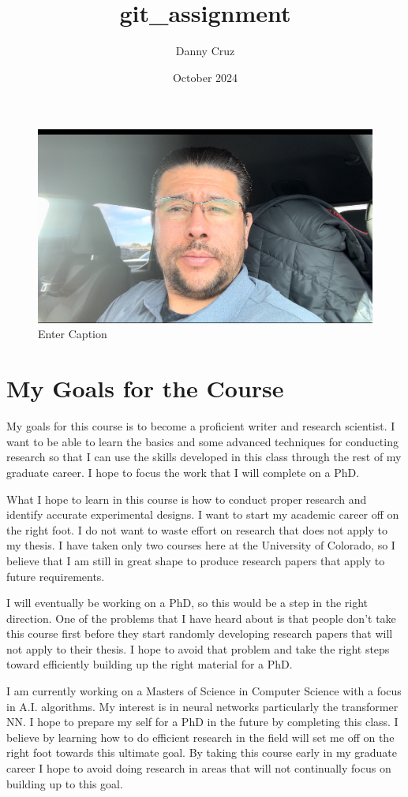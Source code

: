 \documentclass{article}
\begin{document}
\title{git_assignment}
\author{Danny Cruz}
\date{October 2024}

\begin{figure}
    \centering
    \includegraphics[width=0.5\linewidth]{images/cruz-F24.png}
    \caption{Enter Caption}
    \label{fig:enter-label}
\end{figure}

\section{My Goals for the Course}
My goals for this course is to become a proficient writer and research scientist. I want to be able to learn the basics and some advanced techniques for conducting research so that I can use the skills developed in this class through the rest of my graduate career. I hope to focus the work that I will complete on a PhD.

What I hope to learn in this course is how to conduct proper research and identify accurate experimental designs. I want to start my academic career off on the right foot. I do not want to waste effort on research that does not apply to my thesis. I have taken only two courses here at the University of Colorado, so I believe that I am still in great shape to produce research papers that apply to future requirements. 

I will eventually be working on a PhD, so this would be a step in the right direction. One of the problems that I have heard about is that people don't take this course first before they start randomly developing research papers that will not apply to their thesis. I hope to avoid that problem and take the right steps toward efficiently building up the right material for a PhD.

I am currently working on a Masters of Science in Computer Science with a focus in A.I. algorithms. My interest is in neural networks particularly the transformer NN. I hope to prepare my self for a PhD in the future by completing this class. I believe by learning how to do efficient research in the field will set me off on the right foot towards this ultimate goal. By taking this course early in my graduate career I hope to avoid doing research in areas that will not continually focus on building up to this goal.
\end{document}
